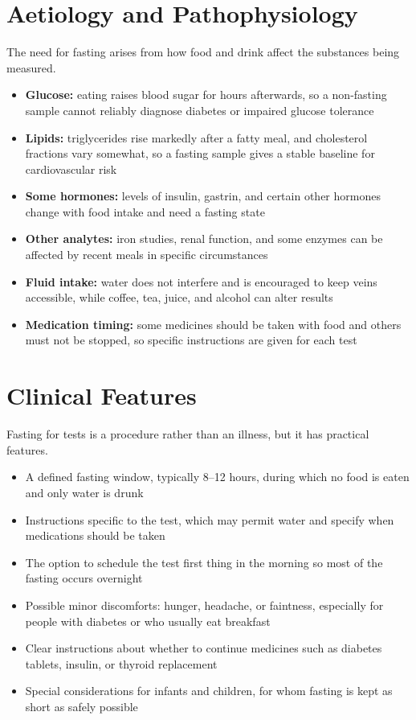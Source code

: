 \section*{Aetiology and Pathophysiology}
The need for fasting arises from how food and drink affect the substances being measured.
\begin{itemize}
    \item \textbf{Glucose:} eating raises blood sugar for hours afterwards, so a non-fasting sample cannot reliably diagnose diabetes or impaired glucose tolerance
    \item \textbf{Lipids:} triglycerides rise markedly after a fatty meal, and cholesterol fractions vary somewhat, so a fasting sample gives a stable baseline for cardiovascular risk
    \item \textbf{Some hormones:} levels of insulin, gastrin, and certain other hormones change with food intake and need a fasting state
    \item \textbf{Other analytes:} iron studies, renal function, and some enzymes can be affected by recent meals in specific circumstances
    \item \textbf{Fluid intake:} water does not interfere and is encouraged to keep veins accessible, while coffee, tea, juice, and alcohol can alter results
    \item \textbf{Medication timing:} some medicines should be taken with food and others must not be stopped, so specific instructions are given for each test
\end{itemize}

\section*{Clinical Features}
Fasting for tests is a procedure rather than an illness, but it has practical features.
\begin{itemize}
    \item A defined fasting window, typically 8--12 hours, during which no food is eaten and only water is drunk
    \item Instructions specific to the test, which may permit water and specify when medications should be taken
    \item The option to schedule the test first thing in the morning so most of the fasting occurs overnight
    \item Possible minor discomforts: hunger, headache, or faintness, especially for people with diabetes or who usually eat breakfast
    \item Clear instructions about whether to continue medicines such as diabetes tablets, insulin, or thyroid replacement
    \item Special considerations for infants and children, for whom fasting is kept as short as safely possible
\end{itemize}

